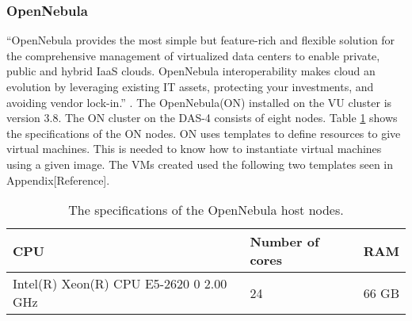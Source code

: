 \subsubsection{OpenNebula}
\label{hw:opennebula}
``OpenNebula  provides the most simple but feature-rich and flexible solution for the comprehensive management of virtualized data centers to enable private, public and hybrid IaaS clouds. OpenNebula interoperability makes cloud an evolution by leveraging existing IT assets, protecting your investments, and avoiding vendor lock-in.'' \cite{opennebula}. The OpenNebula(ON) installed on the VU cluster is version 3.8. The ON cluster on the DAS-4 consists of eight nodes. Table \ref{tab:specs-opennebula} shows the specifications of the ON nodes. ON uses templates to define resources to give virtual machines. This is needed to know how to instantiate virtual machines using a given image. The VMs created used the following two templates seen in Appendix[Reference].
\begin{table} [!h]
	\begin{center}
	\begin{tabular}{|l|l|l|}
		\hline
		CPU & Number of cores & RAM  \\ \hline
		Intel(R) Xeon(R) CPU E5-2620 0 2.00 GHz & 24 & 66 GB\\ \hline
	\end{tabular}
	\caption{The specifications of the OpenNebula host nodes.}
	\label{tab:specs-opennebula}
	\end{center}
\end{table}

